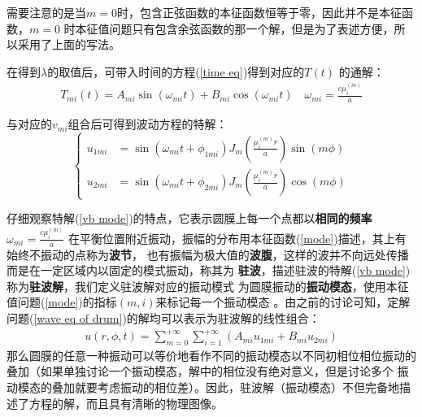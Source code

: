 \documentclass[a4paper]{ctexart}
\begin{document}
	需要注意的是当$m=0$时，包含正弦函数的本征函数恒等于零，因此并不是本征函数，$m=0$
	时本征值问题只有包含余弦函数的那一个解，但是为了表述方便，所以采用了上面的写法。
	\par 
	在得到$\lambda$的取值后，可带入时间的方程(\ref{time eq})得到对应的$T(t)$
	的通解：
	\begin{align}
		T_{mi}(t) = A_{mi}\sin(\omega_{mi}t) + B_{mi}\cos(\omega_{mi}t)\quad \omega_{mi} = \frac{c\mu_{i}^{(m)}}{a}
	\end{align}
	\par 
	\par 与对应的$v_{mi}$组合后可得到波动方程的特解：
	\begin{equation}
		\left\{
			\begin{split}
				u_{1mi} &= \sin(\omega_{mi}t + \phi_{1mi}) 
				J_m\left(\frac{\mu_{i}^{(m)}r}{a}\right)\sin(m\phi)\\
				u_{2mi} &= \sin(\omega_{mi}t + \phi_{2mi})
				J_m\left(\frac{\mu_{i}^{(m)}r}{a}\right)\cos(m\phi)
			\end{split}
		\right.
		\label{vb mode}
	\end{equation}
	\par 
	仔细观察特解(\ref{vb mode})的特点，它表示圆膜上每一个点都以\textbf{相同的频率}$\omega_{mi} = \frac{c\mu_{i}^{(m)}}{a}$
	在平衡位置附近振动，振幅的分布用本征函数(\ref{mode})描述，其上有始终不振动的点称为\textbf{波节}，
	也有振幅为极大值的\textbf{波腹}，这样的波并不向远处传播而是在一定区域内以固定的模式振动，称其为
	\textbf{驻波}，描述驻波的特解(\ref{vb mode})称为\textbf{驻波解}，我们定义驻波解对应的振动模式
	为圆膜振动的\textbf{振动模态}，使用本征值问题(\ref{mode})的指标$(m, i)$来标记每一个振动模态
	。由之前的讨论可知，定解问题(\ref{wave eq of drum})的解均可以表示为驻波解的线性组合：
	\begin{align}
		u(r, \phi, t) = \sum_{m=0}^{+\infty}\sum_{i=1}^{+\infty}(A_{mi}u_{1mi} + B_{mi}u_{2mi})
	\end{align}
	那么圆膜的任意一种振动可以等价地看作不同的振动模态以不同初相位相位振动的叠加（如果单独讨论一个振动模态，解中的相位没有绝对意义，但是讨论多个
	振动模态的叠加就要考虑振动的相位差）。因此，驻波解（振动模态）不但完备地描述了方程的解，而且具有清晰的物理图像。
\end{document}
